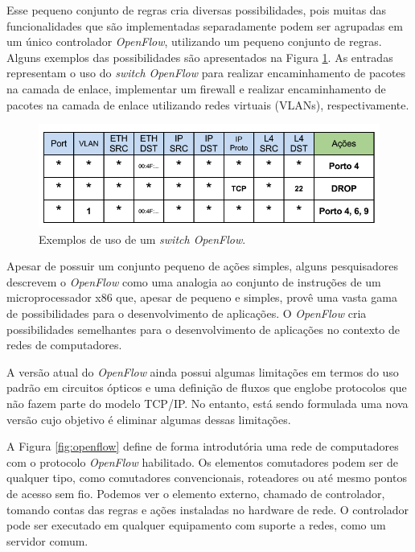 Esse pequeno conjunto de regras cria diversas possibilidades,
pois muitas das funcionalidades que são implementadas 
separadamente podem ser agrupadas em um único controlador
\textit{OpenFlow}, utilizando um pequeno conjunto de regras. Alguns 
exemplos das possibilidades são apresentados na Figura \ref{fig:exemploSwitchOpenFlow}.
As entradas representam o uso do \textit{switch} \textit{OpenFlow}
para realizar encaminhamento de pacotes na camada de enlace,
implementar um firewall e realizar encaminhamento de pacotes 
na camada de enlace utilizando redes virtuais (VLANs), respectivamente.

\begin{figure}[h] \centering
\includegraphics[width=160mm]{exemploSwitchOpenFlow.png} 
\caption{Exemplos de uso de um \textit{switch OpenFlow}.} 
\label{fig:exemploSwitchOpenFlow} 
\end{figure}

Apesar de possuir um conjunto pequeno de ações simples, 
alguns pesquisadores descrevem o \textit{OpenFlow} como uma analogia ao conjunto 
de instruções de um microprocessador x86 que, apesar de 
pequeno e simples, provê uma vasta gama de possibilidades 
para o desenvolvimento de aplicações. O \textit{OpenFlow} cria 
possibilidades semelhantes para o desenvolvimento de 
aplicações no contexto de redes de computadores. 

A versão atual do \textit{OpenFlow} ainda possui algumas limitações
em termos do uso padrão em circuitos ópticos e uma definição 
de fluxos que englobe protocolos que não fazem parte do 
modelo TCP/IP. No entanto, está sendo formulada uma nova
versão cujo objetivo é eliminar algumas dessas limitações.

A Figura \ref{fig:openflow} define de forma introdutória uma 
rede de computadores com o protocolo \textit{OpenFlow} habilitado. Os 
elementos comutadores podem ser de qualquer tipo, como 
comutadores convencionais, roteadores ou até mesmo pontos
de acesso sem fio. Podemos ver o elemento externo, chamado
de controlador, tomando contas das regras e ações instaladas
no hardware de rede. O controlador pode ser executado em 
qualquer equipamento com suporte a redes, como um 
servidor comum.

